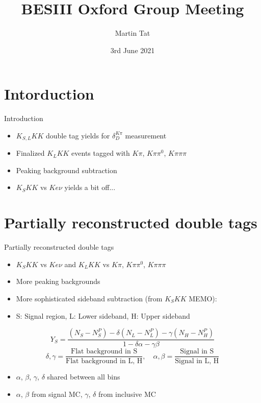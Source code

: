\documentclass{beamer}
\title[BESIII Oxford]{BESIII Oxford Group Meeting}
\author{Martin Tat}
\institute{Oxford LHCb}
\date{3rd June 2021}
\begin{document}
\begin{frame}
  \titlepage
\end{frame}


\section{Intorduction}
\begin{frame}{Introduction}
  \begin{itemize}
    \setlength\itemsep{2em}
    \item{$K_{S, L}KK$ double tag yields for $\delta_D^{K\pi}$ measurement}
    \item{Finalized $K_LKK$ events tagged with $K\pi$, $K\pi\pi^0$, $K\pi\pi\pi$}
    \item{Peaking background subtraction}
    \item{$K_SKK$ vs $Ke\nu$ yields a bit off...}
  \end{itemize}
\end{frame}

\section{Partially reconstructed double tags}
\begin{frame}{Partially reconstructed double tags}
  \begin{itemize}
    \setlength\itemsep{1em}
    \item{$K_SKK$ vs $Ke\nu$ and $K_LKK$ vs $K\pi$, $K\pi\pi^0$, $K\pi\pi\pi$}
    \item{More peaking backgrounds}
    \item{More sophisticated sideband subtraction (from $K_SKK$ MEMO):}
    \item{S: Signal region, L: Lower sideband, H: Upper sideband}
  \end{itemize}
  \begin{equation*}
    Y_S = \frac{(N_S - N_S^P) - \delta(N_L - N_L^P) - \gamma(N_H - N_H^P)}{1 - \delta\alpha - \gamma\beta}
  \end{equation*}
  \begin{equation*}
    \delta, \gamma = \frac{\text{Flat background in S}}{\text{Flat background in L, H}}, \quad \alpha, \beta = \frac{\text{Signal in S}}{\text{Signal in L, H}}
  \end{equation*}
  \begin{itemize}
    \item{$\alpha$, $\beta$, $\gamma$, $\delta$ shared between all bins}
    \item{$\alpha$, $\beta$ from signal MC, $\gamma$, $\delta$ from inclusive MC}
  \end{itemize}
\end{frame}
\end{document}
